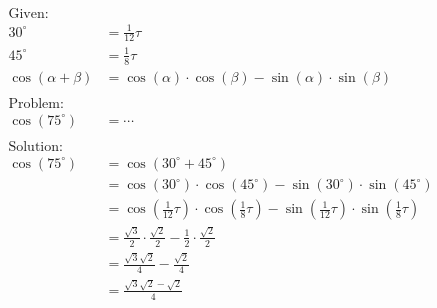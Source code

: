 \begin{equation}
\begin{split}
    {\displaystyle {\text{Given:}}}\\
    30^\circ &= \frac{1}{12}\tau \\
    45^\circ &= \frac{1}{8}\tau \\
    \cos(\alpha + \beta) &= \cos(\alpha) \cdot \cos(\beta) - \sin(\alpha) \cdot \sin(\beta) \\
    &\\
    {\displaystyle {\text{Problem:}}}\\
    \cos(75^\circ) &= \cdots \\
    &\\
    {\displaystyle {\text{Solution:}}}\\
    \cos(75^\circ) &= \cos(30^\circ + 45^\circ) \\
        &= \cos(30^\circ) \cdot \cos(45^\circ) - \sin(30^\circ) \cdot \sin(45^\circ) \\
        &= \cos(\frac{1}{12}\tau) \cdot \cos(\frac{1}{8}\tau) - \sin(\frac{1}{12}\tau) \cdot \sin(\frac{1}{8}\tau) \\
        &= \frac{\sqrt{3}}{2} \cdot \frac{\sqrt{2}}{2} - \frac{1}{2} \cdot \frac{\sqrt{2}}{2} \\
        &= \frac{\sqrt{3} \sqrt{2}}{4} - \frac{\sqrt{2}}{4} \\
        &= \frac{\sqrt{3} \sqrt{2} - \sqrt{2}}{4}
\end{split}
\end{equation}